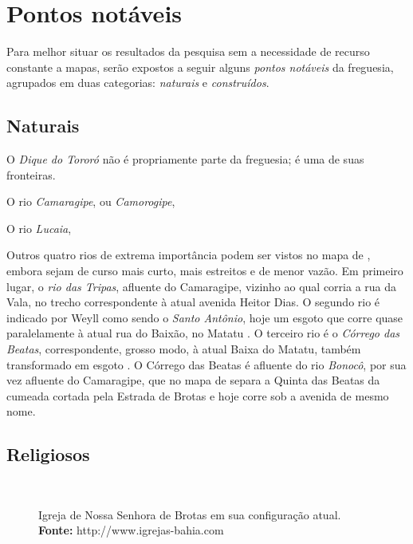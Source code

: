 \section{Pontos notáveis}\label{sec:pontnot}

Para melhor situar os resultados da pesquisa sem a necessidade de recurso constante a mapas, serão expostos a seguir alguns \textit{pontos notáveis} da freguesia, agrupados em duas categorias: \textit{naturais} e \textit{construídos}.

\subsection{Naturais}\label{subsec:pontnat}

O \textit{Dique do Tororó} não é propriamente parte da freguesia; é uma de suas fronteiras. 

O rio \textit{Camaragipe}, ou \textit{Camorogipe},

O rio \textit{Lucaia}, 

Outros quatro rios de extrema importância podem ser vistos no mapa de , embora sejam de curso mais curto, mais estreitos e de menor vazão. Em primeiro lugar, o \textit{rio das Tripas}, afluente do Camaragipe, vizinho ao qual corria a rua da Vala, no trecho correspondente à atual avenida Heitor Dias. O segundo rio é indicado por Weyll como sendo o \textit{Santo Antônio}, hoje um esgoto que corre quase paralelamente à atual rua do Baixão, no Matatu \cite[p.~136]{santos_aguas_2010}. O terceiro rio é o \textit{Córrego das Beatas}, correspondente, grosso modo, à atual Baixa do Matatu, também transformado em esgoto \cite[p.~158]{santos_aguas_2010}. O Córrego das Beatas é afluente do rio \textit{Bonocô}, por sua vez afluente do Camaragipe, que no mapa de  separa a Quinta das Beatas da cumeada cortada pela Estrada de Brotas e hoje corre sob a avenida de mesmo nome.

\subsection{Religiosos}\label{subsec:pontrel}

\begin{figure}[!htp]
\centering
{}
\  %
\  %
\caption{Igreja de Nossa Senhora de Brotas em sua configuração atual. \textbf{Fonte:} http://www.igrejas-bahia.com}
\end{figure}

